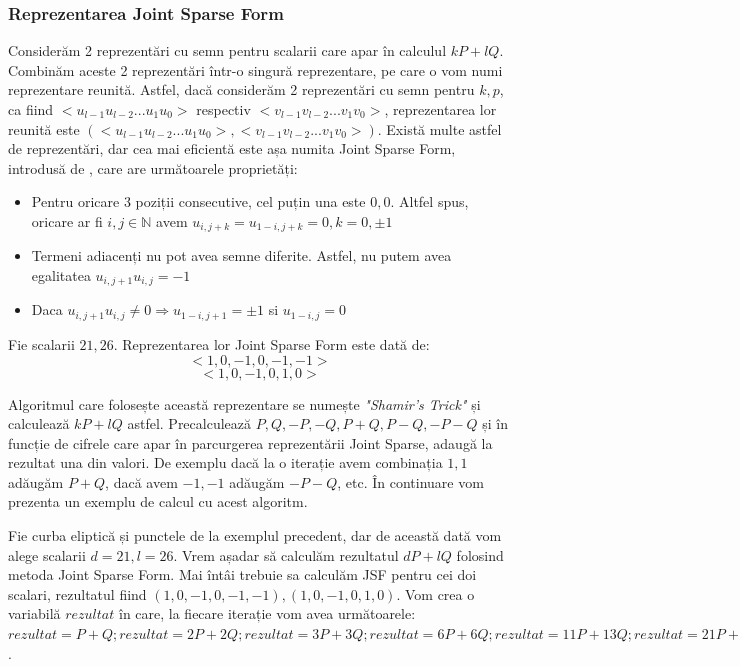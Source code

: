 \subsubsection{Reprezentarea Joint Sparse Form}

\begin{dfn}

Considerăm 2 reprezentări cu semn pentru scalarii care apar în calculul $kP + lQ$. Combinăm aceste 2 reprezentări într-o singură reprezentare, pe care o vom numi reprezentare reunită. Astfel, dacă considerăm 2 reprezentări cu semn pentru $k, p$, ca fiind $<u_{l-1}u_{l-2}...u_1u_0>$ respectiv $<v_{l-1}v_{l-2}...v_1v_0>$, reprezentarea lor reunită este $(<u_{l-1}u_{l-2}...u_1u_0>, <v_{l-1}v_{l-2}...v_1v_0>)$. Există multe astfel de reprezentări, dar cea mai eficientă este așa numita Joint Sparse Form, introdusă de \cite{solinas}, care are următoarele proprietăți:
\begin{itemize}
\item Pentru oricare 3 poziții consecutive, cel puțin una este $0, 0$. Altfel spus, oricare ar fi $i, j\in\mathbb{N}$ avem $u_{i, j+k} = u_{1-i, j+k} = 0, k=0,\pm 1$
\item Termeni adiacenți nu pot avea semne diferite. Astfel, nu putem avea egalitatea $u_{i, j+1}u_{i, j} = -1$
\item Daca $u_{i, j+1}u_{i, j}\neq 0 \Rightarrow u_{1-i, j+1} = \pm 1$ si $u_{1-i, j}=0$
\end{itemize}
\end{dfn}

\begin{ex}
Fie scalarii $21, 26$. Reprezentarea lor Joint Sparse Form este dată de:
$$<1, 0, -1, 0, -1, -1>$$
$$<1, 0, -1, 0, 1, 0>$$
\end{ex}

Algoritmul care folosește această reprezentare se numește \textit{"Shamir's Trick"} și calculează $kP + lQ$ astfel. Precalculează $P, Q, -P, -Q, P + Q, P - Q, -P - Q$ și în funcție de cifrele care apar în parcurgerea reprezentării Joint Sparse, adaugă la rezultat una din valori. De exemplu dacă la o iterație avem combinația $1, 1$ adăugăm $P + Q$, dacă avem $-1, -1$ adăugăm $-P - Q$, etc. În continuare vom prezenta un exemplu de calcul cu acest algoritm.

\begin{ex}
Fie curba eliptică și punctele de la exemplul precedent, dar de această dată vom alege scalarii $d = 21, l = 26$. Vrem așadar să calculăm rezultatul $dP + lQ$ folosind metoda Joint Sparse Form. Mai întâi trebuie sa calculăm JSF pentru cei doi scalari, rezultatul fiind $(1, 0, -1, 0, -1, -1), (1, 0, -1, 0, 1, 0)$. Vom crea o variabilă $rezultat$ în care, la fiecare iterație vom avea următoarele: $rezultat = P + Q; rezultat = 2P + 2Q; rezultat = 3P + 3Q; rezultat = 6P + 6Q; rezultat = 11P + 13Q; rezultat = 21P + 26P = (48, 35)$.

\end{ex}

